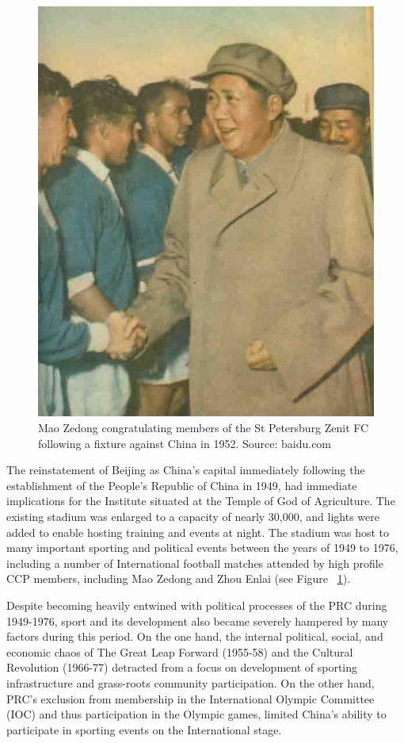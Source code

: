 \begin{CJK}{UTF8}{gbsn}
\begin{figure}[htbp]
  \includegraphics[scale=.5]{images/maoXNT.jpg}
  \caption{Mao Zedong congratulating members of the St Petersburg Zenit FC following a fixture against China in 1952. Source: baidu.com}
  \label{fig:maoXNT}
\end{figure}

The reinstatement of Beijing as China's capital immediately following the establishment of the People's Republic of China in 1949, had immediate implications for the Institute situated at the Temple of God of Agriculture.  The existing stadium was enlarged to a capacity of nearly 30,000, and lights were added to enable hosting training and events at night.  The stadium was host to many important sporting and political events between the years of 1949 to 1976, including a number of International football matches attended by high profile CCP members, including Mao Zedong and Zhou Enlai (see Figure ~\ref{fig:maoXNT}).

Despite becoming heavily entwined with political processes of the PRC during 1949-1976, sport and its development also became severely hampered by many factors during this period.  On the one hand, the internal political, social, and economic chaos of The Great Leap Forward (1955-58) and the Cultural Revolution (1966-77) detracted from a focus on development of sporting infrastructure and grass-roots community participation.  On the other hand, PRC's exclusion from membership in the International Olympic Committee (IOC) and thus participation in the Olympic games, limited China's ability to participate in sporting events on the International stage.







\end{CJK}
